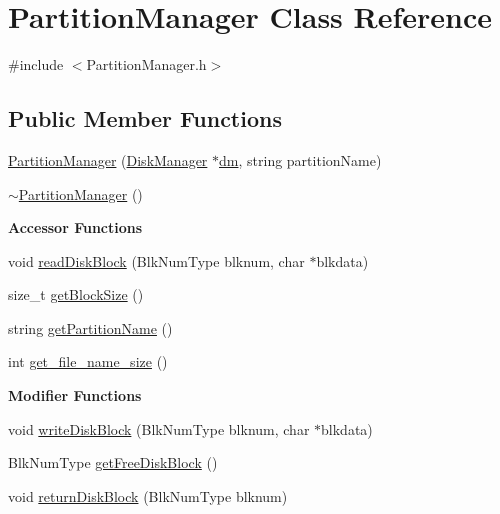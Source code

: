 \hypertarget{class_partition_manager}{}\section{Partition\+Manager Class Reference}
\label{class_partition_manager}


{\ttfamily \#include $<$Partition\+Manager.\+h$>$}

\subsection*{Public Member Functions}
\begin{DoxyCompactItemize}
\item 
\mbox{\hyperlink{class_partition_manager_aa875b0b19b7ab9f32b02d2c9be383b75}{Partition\+Manager}} (\mbox{\hyperlink{class_disk_manager}{Disk\+Manager}} $\ast$\mbox{\hyperlink{daemon_8h_aa4c8f283fd621cbde00155b93e826d00}{dm}}, string partition\+Name)
\item 
\mbox{\hyperlink{class_partition_manager_aa8ab74a681e67990ae59054a7b7daafe}{$\sim$\+Partition\+Manager}} ()
\end{DoxyCompactItemize}
\begin{Indent}\textbf{ Accessor Functions}\par
\begin{DoxyCompactItemize}
\item 
void \mbox{\hyperlink{class_partition_manager_a7aca34c24770b7b9290c489475655ada}{read\+Disk\+Block}} (Blk\+Num\+Type blknum, char $\ast$blkdata)
\item 
size\+\_\+t \mbox{\hyperlink{class_partition_manager_aa1026e17e77f154d7034fafd188bda02}{get\+Block\+Size}} ()
\item 
string \mbox{\hyperlink{class_partition_manager_a7c756dba2665e5a7b62b2ccb261f1158}{get\+Partition\+Name}} ()
\item 
int \mbox{\hyperlink{class_partition_manager_a3b047c1c63c2f9a9e04805471c04ccf0}{get\+\_\+file\+\_\+name\+\_\+size}} ()
\end{DoxyCompactItemize}
\end{Indent}
\begin{Indent}\textbf{ Modifier Functions}\par
\begin{DoxyCompactItemize}
\item 
void \mbox{\hyperlink{class_partition_manager_a114d5d4f8d90b6e9207b09d99e246bed}{write\+Disk\+Block}} (Blk\+Num\+Type blknum, char $\ast$blkdata)
\item 
Blk\+Num\+Type \mbox{\hyperlink{class_partition_manager_a682ce5963a31cf7009455cb1c229b26a}{get\+Free\+Disk\+Block}} ()
\item 
void \mbox{\hyperlink{class_partition_manager_a3ce9b50aa5e7d9063919fc55d125246b}{return\+Disk\+Block}} (Blk\+Num\+Type blknum)
\end{DoxyCompactItemize}
\end{Indent}

